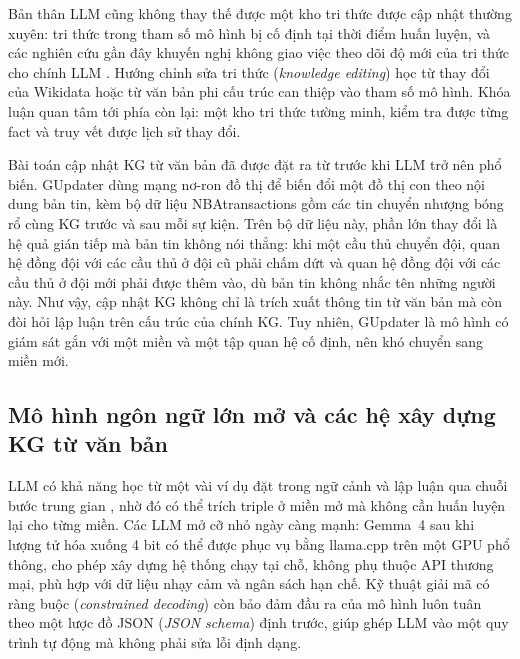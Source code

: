 Bản thân LLM cũng không thay thế được một kho tri thức được cập nhật thường xuyên:
tri thức trong tham số mô hình bị cố định tại thời điểm huấn luyện,
và các nghiên cứu gần đây khuyến nghị không giao việc theo dõi độ mới của tri thức cho chính LLM \cite{freshness2026}.
Hướng chỉnh sửa tri thức (\textit{knowledge editing}) học từ thay đổi của Wikidata \cite{wikifactdiff2024}
hoặc từ văn bản phi cấu trúc \cite{akew2024} can thiệp vào tham số mô hình.
Khóa luận quan tâm tới phía còn lại: một kho tri thức tường minh, kiểm tra được từng fact và truy vết được lịch sử thay đổi.

Bài toán cập nhật KG từ văn bản đã được đặt ra từ trước khi LLM trở nên phổ biến.
GUpdater \cite{tang2019gupdate} dùng mạng nơ-ron đồ thị để biến đổi một đồ thị con theo nội dung bản tin,
kèm bộ dữ liệu NBAtransactions gồm các tin chuyển nhượng bóng rổ cùng KG trước và sau mỗi sự kiện.
Trên bộ dữ liệu này, phần lớn thay đổi là hệ quả gián tiếp mà bản tin không nói thẳng:
khi một cầu thủ chuyển đội, quan hệ đồng đội với các cầu thủ ở đội cũ phải chấm dứt
và quan hệ đồng đội với các cầu thủ ở đội mới phải được thêm vào, dù bản tin không nhắc tên những người này.
Như vậy, cập nhật KG không chỉ là trích xuất thông tin từ văn bản mà còn đòi hỏi lập luận trên cấu trúc của chính KG.
Tuy nhiên, GUpdater là mô hình có giám sát gắn với một miền và một tập quan hệ cố định, nên khó chuyển sang miền mới.

\subsection{Mô hình ngôn ngữ lớn mở và các hệ xây dựng KG từ văn bản}
\label{sec:intro-llm}

LLM có khả năng học từ một vài ví dụ đặt trong ngữ cảnh \cite{brown2020gpt3}
và lập luận qua chuỗi bước trung gian \cite{wei2022cot},
nhờ đó có thể trích triple ở miền mở mà không cần huấn luyện lại cho từng miền.
Các LLM mở cỡ nhỏ ngày càng mạnh: Gemma~4 \cite{gemma4} sau khi lượng tử hóa xuống 4 bit
có thể được phục vụ bằng llama.cpp \cite{llamacpp} trên một GPU phổ thông,
cho phép xây dựng hệ thống chạy tại chỗ, không phụ thuộc API thương mại, phù hợp với dữ liệu nhạy cảm và ngân sách hạn chế.
Kỹ thuật giải mã có ràng buộc (\textit{constrained decoding}) \cite{willard2023outlines}
còn bảo đảm đầu ra của mô hình luôn tuân theo một lược đồ JSON (\textit{JSON schema}) định trước,
giúp ghép LLM vào một quy trình tự động mà không phải sửa lỗi định dạng.

